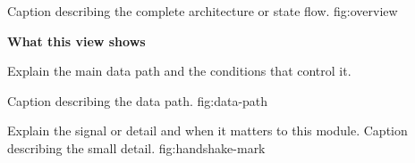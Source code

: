 
  {Caption describing the complete architecture or state flow.}
  {fig:overview}

  {\textbf{What this view shows}\par
   Explain the main data path and the conditions that control it.}
  {Caption describing the data path.}
  {fig:data-path}

  {Explain the signal or detail and when it matters to this module.}
  {Caption describing the small detail.}
  {fig:handshake-mark}
